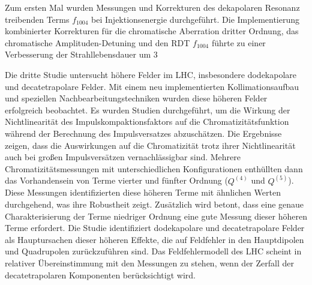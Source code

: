 {Zum ersten Mal wurden Messungen und Korrekturen des dekapolaren Resonanz treibenden Terms $f_{1004}$ bei Injektionsenergie durchgeführt. Die Implementierung kombinierter Korrekturen für die chromatische Aberration dritter Ordnung, das chromatische Amplituden-Detuning und den RDT $f_{1004}$ führte zu einer Verbesserung der Strahllebensdauer um 3 %

Die dritte Studie untersucht höhere Felder im LHC, insbesondere dodekapolare und decatetrapolare Felder. Mit einem neu implementierten Kollimationsaufbau und speziellen Nachbearbeitungstechniken wurden diese höheren Felder erfolgreich beobachtet. Es wurden Studien durchgeführt, um die Wirkung der Nichtlinearität des Impulskompaktionsfaktors auf die Chromatizitätsfunktion während der Berechnung des Impulsversatzes abzuschätzen. Die Ergebnisse zeigen, dass die Auswirkungen auf die Chromatizität trotz ihrer Nichtlinearität auch bei großen Impulsversätzen vernachlässigbar sind. Mehrere Chromatizitätsmessungen mit unterschiedlichen Konfigurationen enthüllten dann das Vorhandensein von Terme vierter und fünfter Ordnung ($Q^{(4)}$ und $Q^{(5)}$). Diese Messungen identifizierten diese höheren Terme mit ähnlichen Werten durchgehend, was ihre Robustheit zeigt. Zusätzlich wird betont, dass eine genaue Charakterisierung der Terme niedriger Ordnung eine gute Messung dieser höheren Terme erfordert. Die Studie identifiziert dodekapolare und decatetrapolare Felder als Hauptursachen dieser höheren Effekte, die auf Feldfehler in den Hauptdipolen und Quadrupolen zurückzuführen sind. Das Feldfehlermodell des LHC scheint in relativer Übereinstimmung mit den Messungen zu stehen, wenn der Zerfall der decatetrapolaren Komponenten berücksichtigt wird.

}
